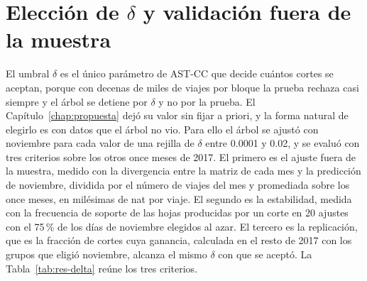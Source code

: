 \section{Elección de $\delta$ y validación fuera de la muestra}\label{sec:res-delta}

El umbral $\delta$ es el único parámetro de AST-CC que decide cuántos cortes se
aceptan, porque con decenas de miles de viajes por bloque la prueba rechaza casi
siempre y el árbol se detiene por $\delta$ y no por la prueba. El
Capítulo~\ref{chap:propuesta} dejó su valor sin fijar a priori, y la forma natural
de elegirlo es con datos que el árbol no vio. Para ello el árbol se ajustó con
noviembre para cada valor de una rejilla de $\delta$ entre 0.0001 y 0.02, y se
evaluó con tres criterios sobre los otros once meses de 2017. El primero es el
ajuste fuera de la muestra, medido con la divergencia entre la matriz de cada mes
y la predicción de noviembre, dividida por el número de viajes del mes y
promediada sobre los once meses, en milésimas de nat por viaje. El segundo es la
estabilidad, medida con la frecuencia de soporte de las hojas producidas por un
corte en 20 ajustes con el 75\,\% de los días de noviembre elegidos al azar. El
tercero es la replicación, que es la fracción de cortes cuya ganancia, calculada
en el resto de 2017 con los grupos que eligió noviembre, alcanza el mismo $\delta$
con que se aceptó. La Tabla~\ref{tab:res-delta} reúne los tres criterios.

